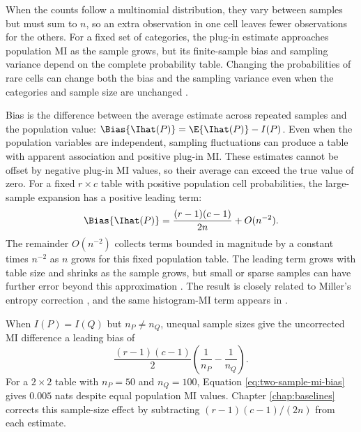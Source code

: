 When the counts follow a multinomial distribution, they vary between samples
but must sum to \(n\), so an extra observation in one cell leaves fewer
observations for the others. For a fixed set of categories, the plug-in
estimate approaches population MI as the sample grows, but its finite-sample
bias and sampling variance depend on the complete probability table.
Changing the probabilities of rare cells can change both the bias and the
sampling variance even when the categories and sample size are unchanged
\citep{paninski2003}.

Bias is the difference between the average estimate across repeated samples
and the population value:
\(\Bias\{\Ihat(P)\}=\E\{\Ihat(P)\}-I(P)\).
Even when the population variables are independent, sampling fluctuations
can produce a table with apparent association and positive plug-in MI.
These estimates cannot be offset by negative plug-in MI values, so their
average can exceed the true value of zero.
For a fixed \(r\times c\) table with positive population cell probabilities,
the large-sample expansion has a positive leading term:
\begin{equation}
  \Bias\{\Ihat(P)\}
  =\frac{(r-1)(c-1)}{2n}+O(n^{-2}).
  \label{eq:mi-leading-bias}
\end{equation}
The remainder \(O(n^{-2})\) collects terms bounded in magnitude by a
constant times \(n^{-2}\) as \(n\) grows for this fixed population table.
The leading term grows with table size and shrinks as the sample grows,
but small or sparse samples can have further error beyond this approximation
\citep{paninski2003}. The result is closely related to Miller's entropy
correction \citep{miller1955}, and the same histogram-MI term appears in
\citet{moddemeijer1989}.

When \(I(P)=I(Q)\) but \(n_P\ne n_Q\), unequal sample sizes give
the uncorrected MI difference a leading bias of
\begin{equation}
  \frac{(r-1)(c-1)}{2}
  \left(\frac{1}{n_P}-\frac{1}{n_Q}\right).
  \label{eq:two-sample-mi-bias}
\end{equation}
For a \(2\times2\) table with \(n_P=50\) and \(n_Q=100\), Equation
\eqref{eq:two-sample-mi-bias} gives \(0.005\) nats despite equal population MI values. Chapter
\ref{chap:baselines} corrects this sample-size effect by subtracting
\((r-1)(c-1)/(2n)\) from each estimate.

\medskip
{}

